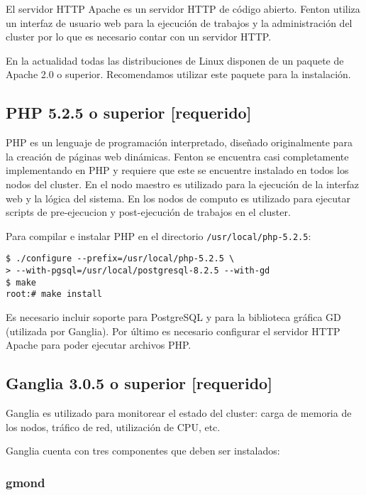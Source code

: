 \documentclass[a4paper,10pt,spanish]{article}
\begin{document}
El servidor HTTP Apache\cite{apache} es un servidor HTTP de c\'{o}digo abierto. Fenton utiliza un interfaz de usuario web para la ejecuci\'{o}n de trabajos y la administraci\'{o}n del cluster por lo que es necesario contar con un servidor HTTP.

En la actualidad todas las distribuciones de Linux disponen de un paquete de Apache 2.0 o superior. Recomendamos utilizar este paquete para la instalaci\'{o}n.

\subsection{PHP 5.2.5 o superior \small{[requerido]}}

PHP\cite{php} es un lenguaje de programaci\'{o}n interpretado, dise\~{n}ado originalmente para la creaci\'{o}n de p\'{a}ginas web din\'{a}micas. Fenton se encuentra casi completamente implementando en PHP y requiere que este se encuentre instalado en todos los nodos del cluster. En el nodo maestro es utilizado para la ejecuci\'{o}n de la interfaz web y la l\'{o}gica del sistema. En los nodos de computo es utilizado para ejecutar scripts de pre-ejecucion y post-ejecuci\'{o}n de trabajos en el cluster.

Para compilar e instalar PHP en el directorio \mbox{\texttt{/usr/local/php-5.2.5}}:

\begin{verbatim}
$ ./configure --prefix=/usr/local/php-5.2.5 \
> --with-pgsql=/usr/local/postgresql-8.2.5 --with-gd 
$ make 
root:# make install
\end{verbatim}

Es necesario incluir soporte para PostgreSQL y para la biblioteca gr\'{a}fica GD (utilizada por Ganglia). Por \'{u}ltimo es necesario configurar el servidor HTTP Apache para poder ejecutar archivos PHP.

\subsection{Ganglia 3.0.5 o superior \small{[requerido]}}

Ganglia es utilizado para monitorear el estado del cluster: carga de memoria de los nodos, tr\'{a}fico de red, utilizaci\'{o}n de CPU, etc. 

Ganglia cuenta con tres componentes que deben ser instalados:

\subsubsection{gmond}
\end{document}
